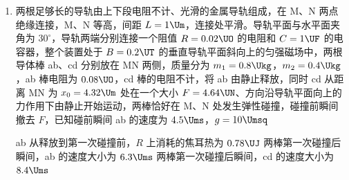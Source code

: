 \documentclass[\gkver]{gaokaozhenti}
\begin{document}
\begin{enumerate}
{再根据几何关系可知 A 点到 O 点的距离为 $y = r\cot\theta = \frac{\sqrt{2}}{2}r$。故 A 错误，B 正确；

C．在 M 点放入一电子，从静止释放，由于 $r > \frac{\sqrt{2}}{2}r$，可知电子向上运动的过程中电场力一直减小，则电子的加速度一直减小，故 C 正确；

D．根据等量同种电荷的电场线分布可知，电子运动过程中，O 点为平衡位置，可知当发生位移 $x$ 时，粒子受到的电场力为

$F = keq\cdot\frac{-4rx}{(r+x)^{2}(r-x)^{2}}$

由于 $x \ll r$，整理后有

$F = -\frac{4keq}{r^{3}}\cdot x$

在 N 点放入一电子，从静止释放，电子将以 O 点为平衡位置做简谐运动，故 D 正确。

故选 BCD。
}

\item
两根足够长的导轨由上下段电阻不计、光滑的金属导轨组成，在 M、N 两点绝缘连接，M、N 等高，间距 $L = 1 \Um$，连接处平滑。导轨平面与水平面夹角为 $30^\circ$，导轨两端分别连接一个阻值 $R = 0.02 \UO$ 的电阻和 $C = 1 \UF$ 的电容器，整个装置处于 $B = 0.2 \UT$ 的垂直导轨平面斜向上的匀强磁场中，两根导体棒 ab、cd 分别放在 MN 两侧，质量分为 $m_{1} = 0.8 \Ukg$，$m_{2} = 0.4 \Ukg$，ab 棒电阻为 $0.08 \UO$，cd 棒的电阻不计，将 ab 由静止释放，同时 cd 从距离 MN 为 $x_{0} = 4.32 \Um$ 处在一个大小 $F = 4.64 \UN$、方向沿导轨平面向上的力作用下由静止开始运动，两棒恰好在 M、N 处发生弹性碰撞，碰撞前瞬间撤去 $F$，已知碰前瞬间 ab 的速度为 $4.5 \Ums$，$g = 10 \Umsq$


{ab 从释放到第一次碰撞前，$R$ 上消耗的焦耳热为 $0.78 \UJ$}
{两棒第一次碰撞后瞬间，ab 的速度大小为 $6.3 \Ums$}
{两棒第一次碰撞后瞬间，cd 的速度大小为 $8.4 \Ums$}

\end{enumerate}
\end{document}
